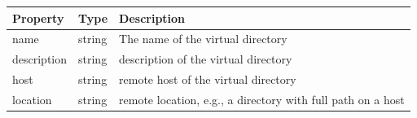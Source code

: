 \documentclass[9pt,]{article}
\begin{document}
\begin{longtable}[]{@{}lll@{}}
\toprule
\begin{minipage}[b]{0.17\columnwidth}\raggedright
Property\strut
\end{minipage} & \begin{minipage}[b]{0.14\columnwidth}\raggedright
Type\strut
\end{minipage} & \begin{minipage}[b]{0.58\columnwidth}\raggedright
Description\strut
\end{minipage}\tabularnewline
\midrule
\endhead
\begin{minipage}[t]{0.17\columnwidth}\raggedright
name\strut
\end{minipage} & \begin{minipage}[t]{0.14\columnwidth}\raggedright
string\strut
\end{minipage} & \begin{minipage}[t]{0.58\columnwidth}\raggedright
The name of the virtual directory\strut
\end{minipage}\tabularnewline
\begin{minipage}[t]{0.17\columnwidth}\raggedright
description\strut
\end{minipage} & \begin{minipage}[t]{0.14\columnwidth}\raggedright
string\strut
\end{minipage} & \begin{minipage}[t]{0.58\columnwidth}\raggedright
description of the virtual directory\strut
\end{minipage}\tabularnewline
\begin{minipage}[t]{0.17\columnwidth}\raggedright
host\strut
\end{minipage} & \begin{minipage}[t]{0.14\columnwidth}\raggedright
string\strut
\end{minipage} & \begin{minipage}[t]{0.58\columnwidth}\raggedright
remote host of the virtual directory\strut
\end{minipage}\tabularnewline
\begin{minipage}[t]{0.17\columnwidth}\raggedright
location\strut
\end{minipage} & \begin{minipage}[t]{0.14\columnwidth}\raggedright
string\strut
\end{minipage} & \begin{minipage}[t]{0.58\columnwidth}\raggedright
remote location, e.g., a directory with full path on a host\strut

\end{minipage}
\end{longtable}
\end{document}
